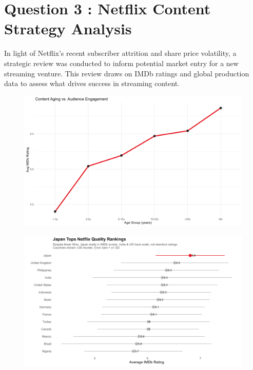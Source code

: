 \documentclass[
  man,floatsintext]{apa6}
\begin{document}
\section{Question 3 : Netflix Content Strategy Analysis}\label{question-3-netflix-content-strategy-analysis}

In light of Netflix's recent subscriber attrition and share price volatility, a strategic review was conducted to inform potential market entry for a new streaming venture. This review draws on IMDb ratings and global production data to assess what drives success in streaming content.

\begin{figure}

{\centering \includegraphics[width=0.9\linewidth]{../Question3/Results/audienceengage} 

}

\caption{ }\label{fig:audienceengage-1}
\end{figure}
\begin{figure}

{\centering \includegraphics[width=0.9\linewidth]{../Question3/Results/countryrating} 

}

\caption{ }\label{fig:audienceengage-2}
\end{figure}
\end{document}
